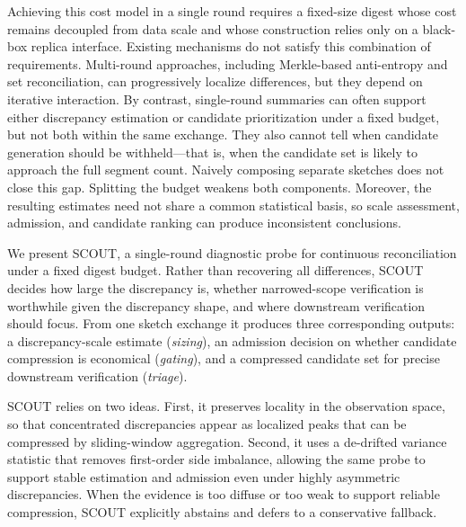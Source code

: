 
Achieving this cost model in a single round requires a fixed-size digest whose cost remains decoupled from data scale and whose construction relies only on a black-box replica interface. Existing mechanisms do
not satisfy this combination of requirements. Multi-round approaches, including Merkle-based anti-entropy and set reconciliation, can progressively localize differences, but they depend on iterative
interaction. By contrast, single-round summaries can often support either discrepancy estimation or candidate prioritization under a fixed budget, but not both within the same exchange. They also cannot tell when candidate generation should be withheld—that is, when the candidate set is likely to approach the full segment count. Naively composing separate sketches does not close this gap. Splitting the budget weakens both components. Moreover, the resulting estimates need not share a common statistical basis, so scale assessment, admission, and candidate ranking can produce inconsistent conclusions.


We present SCOUT, a single-round diagnostic probe for continuous reconciliation under a fixed digest budget. Rather than recovering all differences, SCOUT decides how large the discrepancy is, whether narrowed-scope verification is worthwhile given the discrepancy shape, and where downstream verification should focus. From one sketch exchange it produces three corresponding outputs: a discrepancy-scale estimate (\emph{sizing}), an admission decision on whether candidate compression is economical (\emph{gating}), and a compressed candidate set for precise downstream verification (\emph{triage}).

SCOUT relies on two ideas. First, it preserves locality in the observation space, so that concentrated discrepancies appear as localized peaks that can be compressed by sliding-window aggregation. Second, it uses a de-drifted variance statistic that removes first-order side imbalance, allowing the same probe to support stable estimation and admission even under highly asymmetric discrepancies. When the evidence is too diffuse or too weak to support reliable compression, SCOUT explicitly abstains and defers to a conservative fallback.


